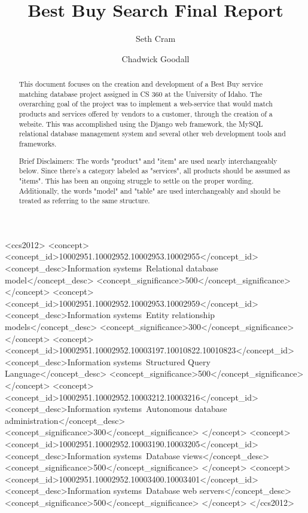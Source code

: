 \documentclass[sigconf]{acmart}
\begin{document}
\title{Best Buy Search Final Report}

\author{Seth Cram}

\author{Chadwick Goodall}

\begin{abstract}

This document focuses on the creation and development of a Best Buy service matching database project assigned in CS 360 at the University of Idaho. The overarching goal of the project was to implement a web-service that would match products and services offered by vendors to a customer, through the creation of a website. This was accomplished using the Django web framework, the MySQL relational database management system and several other web development tools and frameworks. 

Brief Disclaimers: The words "product" and "item" are used nearly interchangeably below. Since there's a category labeled as "services", all products should be assumed as "items". This has been an ongoing struggle to settle on the proper wording. Additionally, the words "model" and "table" are used interchangeably and should be treated as referring to the same structure.

\end{abstract}


\begin{CCSXML}
<ccs2012>
   <concept>
       <concept_id>10002951.10002952.10002953.10002955</concept_id>
       <concept_desc>Information systems~Relational database model</concept_desc>
       <concept_significance>500</concept_significance>
       </concept>
   <concept>
       <concept_id>10002951.10002952.10002953.10002959</concept_id>
       <concept_desc>Information systems~Entity relationship models</concept_desc>
       <concept_significance>300</concept_significance>
       </concept>
   <concept>
       <concept_id>10002951.10002952.10003197.10010822.10010823</concept_id>
       <concept_desc>Information systems~Structured Query Language</concept_desc>
       <concept_significance>500</concept_significance>
       </concept>
   <concept>
       <concept_id>10002951.10002952.10003212.10003216</concept_id>
       <concept_desc>Information systems~Autonomous database administration</concept_desc>
       <concept_significance>300</concept_significance>
       </concept>
   <concept>
       <concept_id>10002951.10002952.10003190.10003205</concept_id>
       <concept_desc>Information systems~Database views</concept_desc>
       <concept_significance>500</concept_significance>
       </concept>
   <concept>
       <concept_id>10002951.10002952.10003400.10003401</concept_id>
       <concept_desc>Information systems~Database web servers</concept_desc>
       <concept_significance>500</concept_significance>
       </concept>
 </ccs2012>
\end{CCSXML}
\end{document}
